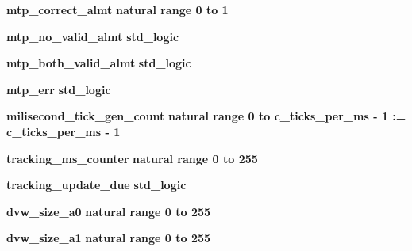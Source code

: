 \begin{DoxyCompactItemize}
\item 
{\bf mtp\+\_\+correct\+\_\+almt} {\bfseries \textcolor{comment}{natural}\textcolor{vhdlchar}{ }\textcolor{vhdlchar}{ }\textcolor{vhdlchar}{ }\textcolor{keywordflow}{range}\textcolor{vhdlchar}{ }\textcolor{vhdlchar}{ } \textcolor{vhdldigit}{0} \textcolor{vhdlchar}{ }\textcolor{keywordflow}{to}\textcolor{vhdlchar}{ }\textcolor{vhdlchar}{ } \textcolor{vhdldigit}{1} \textcolor{vhdlchar}{ }} 
\item 
{\bf mtp\+\_\+no\+\_\+valid\+\_\+almt} {\bfseries \textcolor{comment}{std\+\_\+logic}\textcolor{vhdlchar}{ }} 
\item 
{\bf mtp\+\_\+both\+\_\+valid\+\_\+almt} {\bfseries \textcolor{comment}{std\+\_\+logic}\textcolor{vhdlchar}{ }} 
\item 
{\bf mtp\+\_\+err} {\bfseries \textcolor{comment}{std\+\_\+logic}\textcolor{vhdlchar}{ }} 
\item 
{\bf milisecond\+\_\+tick\+\_\+gen\+\_\+count} {\bfseries \textcolor{comment}{natural}\textcolor{vhdlchar}{ }\textcolor{vhdlchar}{ }\textcolor{vhdlchar}{ }\textcolor{keywordflow}{range}\textcolor{vhdlchar}{ }\textcolor{vhdlchar}{ } \textcolor{vhdldigit}{0} \textcolor{vhdlchar}{ }\textcolor{keywordflow}{to}\textcolor{vhdlchar}{ }\textcolor{vhdlchar}{ }\textcolor{vhdlchar}{ }\textcolor{vhdlchar}{ }{\bfseries {\bf c\+\_\+ticks\+\_\+per\+\_\+ms}} \textcolor{vhdlchar}{-\/}\textcolor{vhdlchar}{ } \textcolor{vhdldigit}{1} \textcolor{vhdlchar}{ }\textcolor{vhdlchar}{\+:}\textcolor{vhdlchar}{=}\textcolor{vhdlchar}{ }\textcolor{vhdlchar}{ }\textcolor{vhdlchar}{ }\textcolor{vhdlchar}{ }{\bfseries {\bf c\+\_\+ticks\+\_\+per\+\_\+ms}} \textcolor{vhdlchar}{-\/}\textcolor{vhdlchar}{ } \textcolor{vhdldigit}{1} \textcolor{vhdlchar}{ }} 
\item 
{\bf tracking\+\_\+ms\+\_\+counter} {\bfseries \textcolor{comment}{natural}\textcolor{vhdlchar}{ }\textcolor{vhdlchar}{ }\textcolor{vhdlchar}{ }\textcolor{keywordflow}{range}\textcolor{vhdlchar}{ }\textcolor{vhdlchar}{ } \textcolor{vhdldigit}{0} \textcolor{vhdlchar}{ }\textcolor{keywordflow}{to}\textcolor{vhdlchar}{ }\textcolor{vhdlchar}{ } \textcolor{vhdldigit}{255} \textcolor{vhdlchar}{ }} 
\item 
{\bf tracking\+\_\+update\+\_\+due} {\bfseries \textcolor{comment}{std\+\_\+logic}\textcolor{vhdlchar}{ }} 
\item 
{\bf dvw\+\_\+size\+\_\+a0} {\bfseries \textcolor{comment}{natural}\textcolor{vhdlchar}{ }\textcolor{vhdlchar}{ }\textcolor{vhdlchar}{ }\textcolor{keywordflow}{range}\textcolor{vhdlchar}{ }\textcolor{vhdlchar}{ } \textcolor{vhdldigit}{0} \textcolor{vhdlchar}{ }\textcolor{keywordflow}{to}\textcolor{vhdlchar}{ }\textcolor{vhdlchar}{ } \textcolor{vhdldigit}{255} \textcolor{vhdlchar}{ }} 
\item 
{\bf dvw\+\_\+size\+\_\+a1} {\bfseries \textcolor{comment}{natural}\textcolor{vhdlchar}{ }\textcolor{vhdlchar}{ }\textcolor{vhdlchar}{ }\textcolor{keywordflow}{range}\textcolor{vhdlchar}{ }\textcolor{vhdlchar}{ } \textcolor{vhdldigit}{0} \textcolor{vhdlchar}{ }\textcolor{keywordflow}{to}\textcolor{vhdlchar}{ }\textcolor{vhdlchar}{ } \textcolor{vhdldigit}{255} \textcolor{vhdlchar}{ }} 
\end{DoxyCompactItemize}


